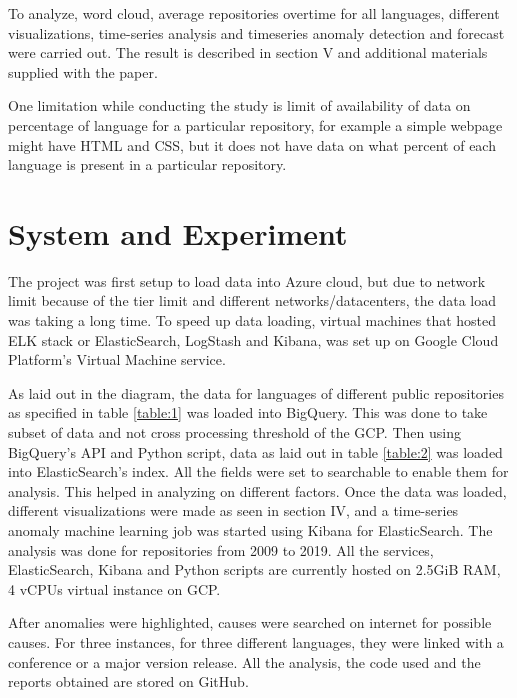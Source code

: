 \documentclass[12pt,conference]{IEEEtran}
\begin{document}
To analyze, word cloud, average repositories overtime for all languages, different visualizations, time-series analysis and timeseries anomaly detection and forecast were carried out. The result is described in section V and additional materials supplied with the paper. 

One limitation while conducting the study is limit of availability of data on percentage of language for a particular repository, for example a simple webpage might have HTML and CSS, but it does not have data on what percent of each language is present in a particular repository.

\section{System and Experiment}

The project was first setup to load data into Azure cloud, but due to network limit because of the tier limit and different networks/datacenters, the data load was taking a long time. To speed up data loading, virtual machines that hosted ELK stack or ElasticSearch, LogStash and Kibana, was set up on Google Cloud Platform's Virtual Machine service. 

As laid out in the diagram, the data for languages of different public repositories as specified in table \ref{table:1} was loaded into BigQuery. This was done to take subset of data and not cross processing threshold of the GCP. Then using BigQuery's API and Python script, data as laid out in table \ref{table:2} was loaded into ElasticSearch's index. All the fields were set to searchable to enable them for analysis. This helped in analyzing on different factors. Once the data was loaded, different visualizations were made as seen in section IV, and a time-series anomaly machine learning \cite{elastic} job was started using Kibana for ElasticSearch. The analysis was done for repositories from 2009 to 2019. All the services, ElasticSearch, Kibana and Python scripts are currently hosted on 2.5GiB RAM, 4 vCPUs virtual instance on GCP.

After anomalies were highlighted, causes were searched on internet for possible causes. For three instances, for three different languages, they were linked with a conference or a major version release.  All the analysis, the code used and the reports obtained are stored on GitHub.
\end{document}
